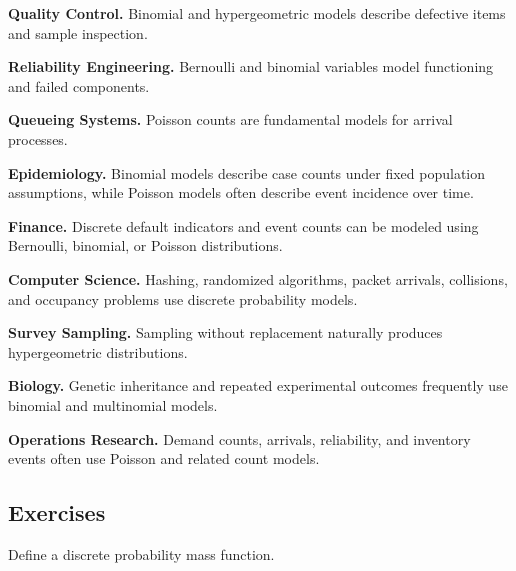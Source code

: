 \begin{applicationbox}

\textbf{Quality Control.}
Binomial and hypergeometric models describe defective items and sample
inspection.

\medskip

\textbf{Reliability Engineering.}
Bernoulli and binomial variables model functioning and failed
components.

\medskip

\textbf{Queueing Systems.}
Poisson counts are fundamental models for arrival processes.

\medskip

\textbf{Epidemiology.}
Binomial models describe case counts under fixed population assumptions,
while Poisson models often describe event incidence over time.

\medskip

\textbf{Finance.}
Discrete default indicators and event counts can be modeled using
Bernoulli, binomial, or Poisson distributions.

\medskip

\textbf{Computer Science.}
Hashing, randomized algorithms, packet arrivals, collisions, and
occupancy problems use discrete probability models.

\medskip

\textbf{Survey Sampling.}
Sampling without replacement naturally produces hypergeometric
distributions.

\medskip

\textbf{Biology.}
Genetic inheritance and repeated experimental outcomes frequently use
binomial and multinomial models.

\medskip

\textbf{Operations Research.}
Demand counts, arrivals, reliability, and inventory events often use
Poisson and related count models.

\end{applicationbox}

\subsection{Exercises}
\label{subsec:discrete-distributions-exercises}

\begin{exercise}[1]
Define a discrete probability mass function.
\end{exercise}

